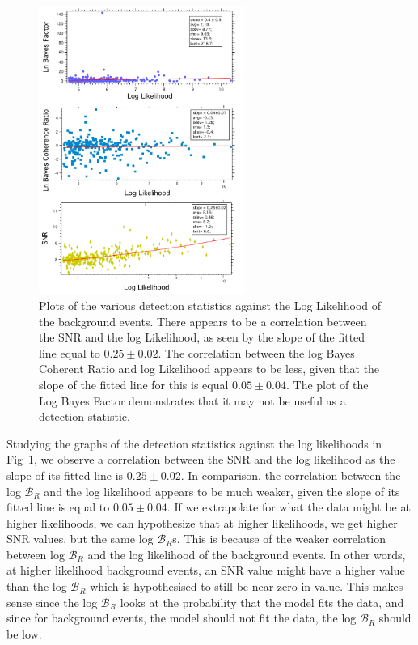 \documentclass{article}
\begin{document}
       
       \begin{figure}[h]
       	\centering
       	\includegraphics[width=0.6\textwidth]{Figures/DetectionStatisticComparison.pdf} 
       	\caption{Plots of the various detection statistics against the Log Likelihood of the background events. There appears to be a correlation between the SNR and the log Likelihood, as seen by the slope of the fitted line equal to $0.25\pm0.02$. The correlation between the log Bayes Coherent Ratio and log Likelihood appears to be less, given that the slope of the fitted line for this is equal $0.05\pm0.04$. The plot of the Log Bayes Factor demonstrates that it may not be useful as a detection statistic.}
       	\label{Fig:SeparateDetectionStatisticVSlnL}
       \end{figure}
                
                
                
     Studying the graphs of the detection statistics against the log likelihoods in Fig~\ref{Fig:SeparateDetectionStatisticVSlnL}, we observe a correlation between the SNR and the log likelihood as the slope of its fitted line is $0.25\pm0.02$. In comparison, the correlation between the log $\mathcal{B}_{R}$ and the log likelihood appears to be much weaker, given the slope of its fitted line is equal to $0.05\pm0.04$. If we extrapolate for what the data might be at higher likelihoods, we can hypothesize that at higher likelihoods, we get higher SNR values, but the same log $\mathcal{B}_{R}$s. This is because of the weaker correlation between log $\mathcal{B}_{R}$ and the log likelihood of the background events. In other words, at higher likelihood background events, an SNR value might have a higher value than the log $\mathcal{B}_{R}$ which is hypothesised to still be near zero in value. This makes sense since the log $\mathcal{B}_{R}$ looks at the probability that the model fits the data, and since for background events, the model should not fit the data, the log $\mathcal{B}_{R}$ should be low.  \\ 
     
\end{document}
